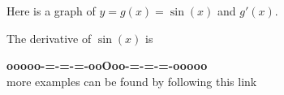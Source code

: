 \documentclass{ximera}
\begin{document}
\begin{example}



Here is a graph of $y = g(x) = \sin(x)$ and $g'(x)$.






\begin{center}
\end{center}



The derivative of $\sin(x)$ is
\begin{multipleChoice}
\end{multipleChoice}


\end{example}
































\begin{center}
\textbf{\textcolor{green!50!black}{ooooo-=-=-=-ooOoo-=-=-=-ooooo}} \\

more examples can be found by following this link\\ 

\end{center}
\end{document}
